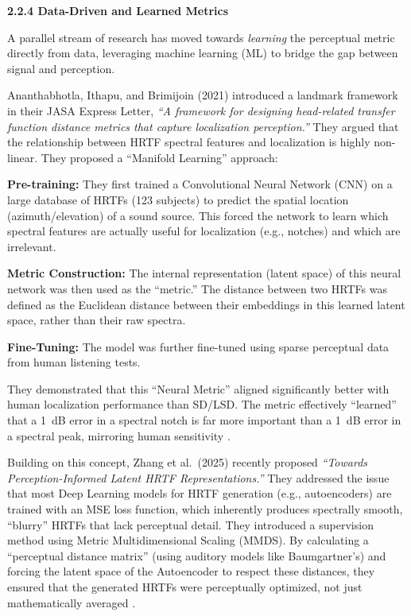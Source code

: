 \documentclass[12pt,a4paper]{article}
\begin{document}
\textbf{2.2.4 Data-Driven and Learned Metrics}

A parallel stream of research has moved towards \textit{learning} the perceptual metric directly from data, leveraging machine learning (ML) to bridge the gap between signal and perception.

Ananthabhotla, Ithapu, and Brimijoin (2021) \cite{ananthabhotla2021} introduced a landmark framework in their JASA Express Letter, \textit{``A framework for designing head-related transfer function distance metrics that capture localization perception.''}  They argued that the relationship between HRTF spectral features and localization is highly non-linear. They proposed a ``Manifold Learning'' approach:

\textbf{Pre-training:} They first trained a Convolutional Neural Network (CNN) on a large database of HRTFs (123 subjects) to predict the spatial location (azimuth/elevation) of a sound source. This forced the network to learn which spectral features are actually useful for localization (e.g., notches) and which are irrelevant.

\textbf{Metric Construction:} The internal representation (latent space) of this neural network was then used as the ``metric.'' The distance between two HRTFs was defined as the Euclidean distance between their embeddings in this learned latent space, rather than their raw spectra.

\textbf{Fine-Tuning:} The model was further fine-tuned using sparse perceptual data from human listening tests.

They demonstrated that this ``Neural Metric'' aligned significantly better with human localization performance than SD/LSD. The metric effectively ``learned'' that a 1~dB error in a spectral notch is far more important than a 1~dB error in a spectral peak, mirroring human sensitivity \cite{ananthabhotla2021}.

Building on this concept, Zhang et al.\ (2025) \cite{zhang2025} recently proposed \textit{``Towards Perception-Informed Latent HRTF Representations.''} They addressed the issue that most Deep Learning models for HRTF generation (e.g., autoencoders) are trained with an MSE loss function, which inherently produces spectrally smooth, ``blurry'' HRTFs that lack perceptual detail. They introduced a supervision method using Metric Multidimensional Scaling (MMDS). By calculating a ``perceptual distance matrix'' (using auditory models like Baumgartner's) and forcing the latent space of the Autoencoder to respect these distances, they ensured that the generated HRTFs were perceptually optimized, not just mathematically averaged \cite{zhang2025}.
\end{document}
